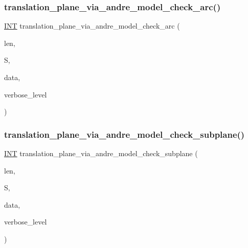 \subsubsection{\texorpdfstring{translation\+\_\+plane\+\_\+via\+\_\+andre\+\_\+model\+\_\+check\+\_\+arc()}{translation\_plane\_via\_andre\_model\_check\_arc()}}
{\footnotesize\ttfamily \mbox{\hyperlink{galois_8h_a09fddde158a3a20bd2dcadb609de11dc}{I\+NT}} translation\+\_\+plane\+\_\+via\+\_\+andre\+\_\+model\+\_\+check\+\_\+arc (\begin{DoxyParamCaption}\item[{\mbox{\hyperlink{galois_8h_a09fddde158a3a20bd2dcadb609de11dc}{I\+NT}}}]{len,  }\item[{\mbox{\hyperlink{galois_8h_a09fddde158a3a20bd2dcadb609de11dc}{I\+NT}} $\ast$}]{S,  }\item[{void $\ast$}]{data,  }\item[{\mbox{\hyperlink{galois_8h_a09fddde158a3a20bd2dcadb609de11dc}{I\+NT}}}]{verbose\+\_\+level }\end{DoxyParamCaption})}

\mbox{\label{translation__plane__via__andre__model_8_c_abf204a455a8698c7340fe92376031d50}} 
\subsubsection{\texorpdfstring{translation\+\_\+plane\+\_\+via\+\_\+andre\+\_\+model\+\_\+check\+\_\+subplane()}{translation\_plane\_via\_andre\_model\_check\_subplane()}}
{\footnotesize\ttfamily \mbox{\hyperlink{galois_8h_a09fddde158a3a20bd2dcadb609de11dc}{I\+NT}} translation\+\_\+plane\+\_\+via\+\_\+andre\+\_\+model\+\_\+check\+\_\+subplane (\begin{DoxyParamCaption}\item[{\mbox{\hyperlink{galois_8h_a09fddde158a3a20bd2dcadb609de11dc}{I\+NT}}}]{len,  }\item[{\mbox{\hyperlink{galois_8h_a09fddde158a3a20bd2dcadb609de11dc}{I\+NT}} $\ast$}]{S,  }\item[{void $\ast$}]{data,  }\item[{\mbox{\hyperlink{galois_8h_a09fddde158a3a20bd2dcadb609de11dc}{I\+NT}}}]{verbose\+\_\+level }\end{DoxyParamCaption})}

